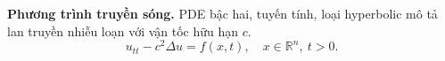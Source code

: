 \textbf{Phương trình truyền sóng.}
PDE bậc hai, tuyến tính, loại hyperbolic mô tả lan truyền nhiễu loạn với vận tốc hữu hạn $c$.
\[ u_{tt} - c^2\Delta u = f(x,t), \quad x\in\mathbb{R}^n,\ t>0. \]
